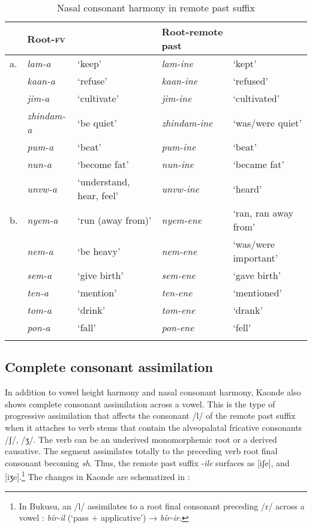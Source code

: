 \documentclass[output=paper]{langsci/langscibook}
\begin{document}
\begin{table}
\small
\begin{tabularx}{\textwidth}{llQll}
\lsptoprule
 & Root-\textsc{fv} &  & Root-remote past & \\
\midrule
a. & \textit{lam-a} & `keep' & \textit{lam-ine} & `kept' \\
 & \textit{kaan-a} & `refuse' & \textit{kaan-ine} & `refused' \\
 & \textit{jim-a} & `cultivate' & \textit{jim-ine} & `cultivated' \\
 & \textit{zhindam-a} & `be quiet' & \textit{zhindam-ine} & `was/were quiet' \\
 & \textit{pum-a} & `beat' & \textit{pum-ine} & `beat' \\
 & \textit{nun-a} & `become fat' & \textit{nun-ine} & `became fat' \\
 & \textit{unvw-a} & `understand, hear, feel' & \textit{unvw-ine} & `heard' \\
\tablevspace
b. & \textit{nyem-a} & `run (away from)' & \textit{nyem-ene} & `ran, ran away from' \\
 & \textit{nem-a} & `be heavy' & \textit{nem-ene} & `was/were important' \\
 & \textit{sem-a} & `give birth' & \textit{sem-ene} & `gave birth' \\
 & \textit{ten-a} & `mention' & \textit{ten-ene} & `mentioned' \\
 & \textit{tom-a} & `drink' & \textit{tom-ene} & `drank' \\
 & \textit{pon-a} & `fall' & \textit{pon-ene} & `fell' \\

\lspbottomrule
\end{tabularx}

\caption{Nasal consonant harmony in remote past suffix}
\label{tab:4.kawasha}

\end{table}

\subsection{Complete consonant assimilation}


In addition to vowel height harmony and nasal consonant harmony, Kaonde also shows complete consonant assimilation across a vowel. This is the type of progressive assimilation that affects the consonant /l/ of the remote past suffix when it attaches to verb stems that contain the alveopalatal fricative consonants /ʃ/, /ʒ/. The verb can be an underived monomorphemic root or a derived causative. The segment assimilates totally to the preceding verb root final consonant becoming \textit{sh}. Thus, the remote past suffix -\textit{ile} surfaces as [iʃe], and [iʒe].\footnote{In Bukusu, an /l/ assimilates to a root final consonant preceding /r/ across a vowel \citep{hyman2003b}: \textit{bír-il} (‘pass + applicative’) → \textit{bír-ir}.} The changes in Kaonde are schematized in :
\end{document}
